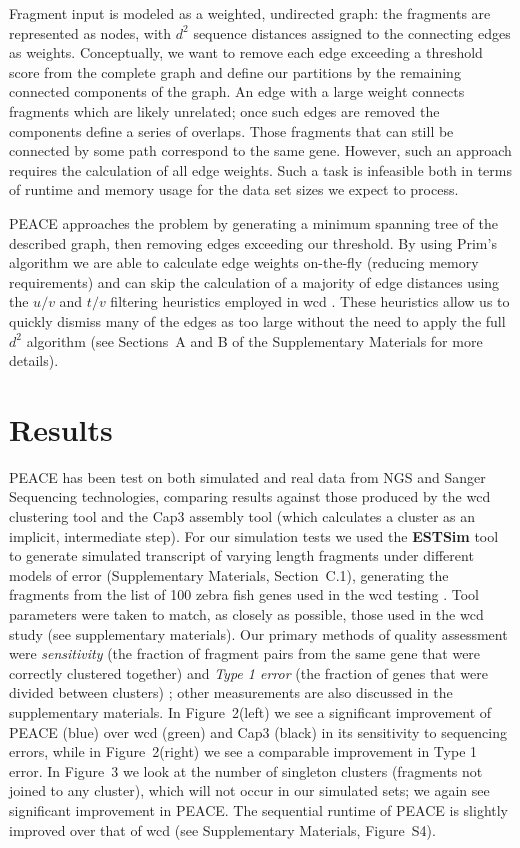 \documentclass[a4,center,fleqn]{NAR}
\newcommand{\peace} {{\small PEACE}}
\begin{document}
Fragment input is modeled as a weighted, undirected graph: the fragments
are represented as nodes, with $d^2$ sequence distances assigned to
the connecting edges as weights.  Conceptually, we want to remove each
edge exceeding a threshold score from the complete graph and define
our partitions by the remaining connected components of the graph.  An
edge with a large weight connects fragments which are likely unrelated;
once such edges are removed the components define a series of
overlaps.  Those fragments that can still be connected by some path
correspond to the same gene.  However, such an approach requires the
calculation of all edge weights.  Such a task is infeasible both in terms of
runtime and memory usage for the data set sizes we expect to process.

\peace\/ approaches the problem by generating a minimum spanning tree of the
described graph, then removing edges exceeding our threshold.  By
using Prim's algorithm we are able to calculate edge weights
on-the-fly (reducing memory requirements) and can skip the
calculation of a majority of edge distances using the $u/v$ and $t/v$
filtering heuristics employed in {\sc wcd} \cite{Hazelhurst08a}.
These heuristics allow us to quickly dismiss many of the edges as too
large without the need to apply the full $d^2$ algorithm (see
Sections~A and B of the Supplementary Materials for more details). 

\section{Results}

\peace\/ has been test on both simulated and real data from NGS and
Sanger Sequencing technologies, comparing results against those
produced by the {\sc wcd} clustering tool \cite{Hazelhurst08a} and the
{\sc Cap3} assembly tool \cite{Huang99} (which calculates a cluster as
an implicit, intermediate step).  For our simulation tests we used the
{\bf ESTSim} tool \cite{Hazelhurst03} to generate simulated transcript
of varying length fragments under different models of error
(Supplementary Materials, Section~C.1), generating the fragments from
the list of 100 zebra fish genes used in the {\sc wcd} testing
\cite{Hazelhurst08a}.  Tool parameters were taken to match, as closely
as possible, those used in the {\sc wcd} study (see supplementary
materials).  Our primary methods of quality assessment were {\it
  sensitivity} (the fraction of fragment pairs from the same gene that
were correctly clustered together) and {\it Type 1 error} (the
fraction of genes that were divided between clusters)
\cite{Wang04,Hazelhurst08a}; other measurements are also discussed in
the supplementary materials.  In Figure~2(left) we see a significant
improvement of \peace\/ (blue) over {\sc wcd} (green) and {\sc
  Cap3} (black) in its sensitivity to sequencing errors, while in
Figure~2(right) we see a comparable improvement in Type 1 error.  In
Figure~3 we look at the number of singleton clusters (fragments not
joined to any cluster), which will not occur in our simulated sets; we
again see significant improvement in \peace.  The sequential
runtime of \peace\/ is slightly improved over that of {\sc wcd}
(see Supplementary Materials, Figure~S4).
\end{document}
